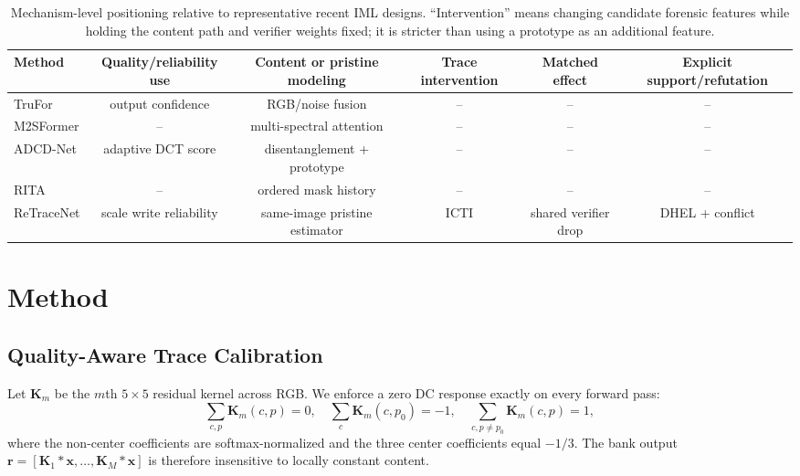 \documentclass[journal]{IEEEtran}
\newcommand{\method}{ReTraceNet}
\begin{document}
\begin{table}[t]
\centering
\caption{Mechanism-level positioning relative to representative recent IML
designs. ``Intervention'' means changing candidate forensic features while
holding the content path and verifier weights fixed; it is stricter than using a
prototype as an additional feature.}
\label{tab:mechanism_position}
\setlength{\tabcolsep}{4.2pt}
\begin{tabular}{lccccc}
\toprule
Method & Quality/reliability use & Content or pristine modeling & Trace intervention
& Matched effect & Explicit support/refutation\\
\midrule
TruFor \cite{guillaro2023trufor} & output confidence & RGB/noise fusion & -- & -- & --\\
M2SFormer \cite{nam2025m2sformer} & -- & multi-spectral attention & -- & -- & --\\
ADCD-Net \cite{wong2025adcd} & adaptive DCT score & disentanglement + prototype & -- & -- & --\\
RITA \cite{zhu2026rita} & -- & ordered mask history & -- & -- & --\\
\method{} & scale write reliability & same-image pristine estimator & ICTI
& shared verifier drop & DHEL + conflict\\
\bottomrule
\end{tabular}
\end{table}

\section{Method}

\iffalse %
\subsection{Quality-Aware Trace Calibration}
Let $\mathbf{K}_m$ be the $m$th $5\!\times\!5$ residual kernel across RGB.  We
enforce a zero DC response exactly on every forward pass:
\begin{equation}
\sum_{c,p}\mathbf K_m(c,p)=0,\quad
\sum_c\mathbf K_m(c,p_0)=-1,\quad
\sum_{c,p\ne p_0}\mathbf K_m(c,p)=1,
\label{eq:constraint}
\end{equation}
where the non-center coefficients are softmax-normalized and the three center
coefficients equal $-1/3$.  The bank output
$\mathbf r=[\mathbf K_1*\mathbf x,\ldots,\mathbf K_M*\mathbf x]$ is therefore
insensitive to locally constant content.
\end{document}
